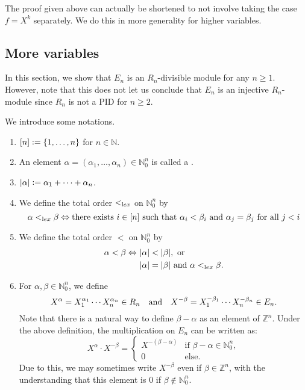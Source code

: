 The proof given above can actually be shortened to not involve taking the case $f = X^{k}$ separately. We do this in more generality for higher variables.

\subsection{More variables}

In this section, we show that $E_{n}$ is an $R_{n}$-divisible module for any $n \ge 1$. However, note that this does not let us conclude that $E_{n}$ is an injective $R_{n}$-module since $R_{n}$ is not a PID for $n \ge 2$.

We introduce some notations.

\begin{enumerate}
	\item $[n] \vcentcolon= \{1, \ldots, n\}$ for $n \in \mathbb{N}$.
	\item An element $\alpha = (\alpha_{1}, \ldots, \alpha_{n}) \in \mathbb{N}_{0}^{n}$ is called a . 
	\item ${\left\lvert \alpha \right\lvert} \vcentcolon= \alpha_{1} + \cdots + \alpha_{n}$.
	\item We define the total order $<_{{\mathrm lex}}$ on $\mathbb{N}_{0}^{n}$ by
	\begin{equation*} 
		\alpha <_{{\mathrm lex}} \beta \Leftrightarrow \text{there exists $i \in [n]$ such that $\alpha_{i} < \beta_{i}$ and $\alpha_{j} = \beta_{j}$ for all $j < i$}
	\end{equation*}
	\item We define the total order $<$ on $\mathbb{N}_{0}^{n}$ by
	\begin{align*} 
		\alpha < \beta \Leftrightarrow\ & {\left\lvert \alpha \right\lvert} < {\left\lvert \beta \right\lvert}, \text{ or } \\
		& {\left\lvert \alpha \right\lvert} = {\left\lvert \beta \right\lvert} \text{ and } \alpha <_{{\mathrm lex}} \beta.
	\end{align*}
	\item For $\alpha, \beta \in \mathbb{N}_{0}^{n}$, we define
	\begin{equation*} 
		X^{\alpha} = X_{1}^{\alpha_{1}} \cdots X_{n}^{\alpha_{n}} \in R_{n} \quad\text{and}\quad X^{-\beta} = X_{1}^{-\beta_{1}} \cdots X_{n}^{-\beta_{n}} \in E_{n}.
	\end{equation*}
	Note that there is a natural way to define $\beta - \alpha$ as an element of $\mathbb{Z}^{n}$. Under the above definition, the multiplication on $E_{n}$ can be written as:
	\begin{equation*} 
		X^{\alpha} \cdot X^{-\beta} = 
		\begin{cases}
			X^{-(\beta - \alpha)} & \text{if }\beta - \alpha \in \mathbb{N}_{0}^{n}, \\
			0 & \text{else}.
		\end{cases}
	\end{equation*}
	Due to this, we may sometimes write $X^{-\beta}$ even if $\beta \in \mathbb{Z}^{n}$, with the understanding that this element is $0$ if $\beta \notin \mathbb{N}_{0}^{n}$.
\end{enumerate}


